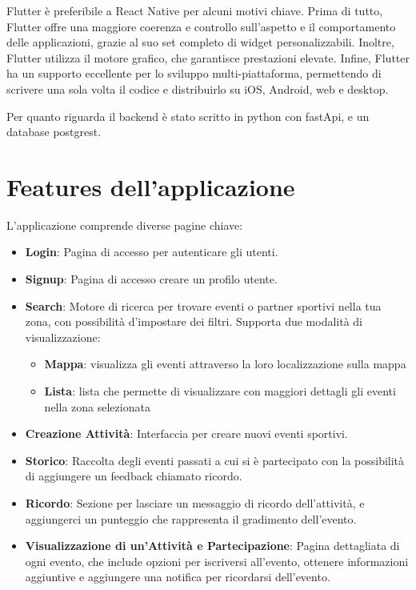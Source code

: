 \documentclass[a4paper,12pt]{article}
\begin{document}
Flutter è preferibile a React Native per alcuni motivi chiave. Prima di tutto, Flutter offre una maggiore coerenza e controllo sull'aspetto e il comportamento delle applicazioni, grazie al suo set completo di widget personalizzabili.
Inoltre, Flutter utilizza il motore grafico, che garantisce prestazioni elevate. 
Infine, Flutter ha un supporto eccellente per lo sviluppo multi-piattaforma, permettendo di scrivere una sola volta il codice e distribuirlo su iOS, Android, web e desktop.


Per quanto riguarda il backend è stato scritto in python con fastApi, e un database postgrest.

\newpage
\section{Features dell'applicazione}

L'applicazione comprende diverse pagine chiave:

\begin{itemize}
    \item \textbf{Login}: Pagina di accesso per autenticare gli utenti.
    \item \textbf{Signup}: Pagina di accesso creare un profilo utente.
    \item \textbf{Search}: Motore di ricerca per trovare eventi o partner sportivi nella tua zona, con possibilità d'impostare dei filtri. Supporta due modalità di visualizzazione:
    \begin{itemize}
        \item \textbf{Mappa}: visualizza gli eventi attraverso la loro localizzazione sulla mappa
        \item \textbf{Lista}: lista che permette di visualizzare con maggiori dettagli gli eventi nella zona selezionata
    \end{itemize}
    \item \textbf{Creazione Attività}: Interfaccia per creare nuovi eventi sportivi.
    \item \textbf{Storico}: Raccolta degli eventi passati a cui si è partecipato con la possibilità di aggiungere un feedback chiamato ricordo.
    \item \textbf{Ricordo}: Sezione per lasciare un messaggio di ricordo dell'attività, e aggiungerci un punteggio che rappresenta il gradimento dell'evento.
    \item \textbf{Visualizzazione di un'Attività e Partecipazione}: Pagina dettagliata di ogni evento, che include opzioni per iscriversi all'evento, ottenere informazioni aggiuntive e aggiungere una notifica per ricordarsi dell'evento.
\end{itemize}
\end{document}
